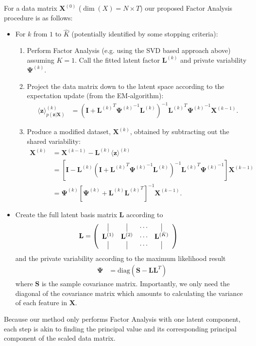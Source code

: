 \documentclass[12pt]{article}
\begin{document}
For a data matrix $\mathbf{X}^{(0)}$ ($\dim(X) = N\times T$) our proposed Factor Analysis procedure is as follows:
\begin{itemize}
	\item For $k$ from $1$ to $\hat{K}$ (potentially identified by some stopping criteria):
	\begin{enumerate}[label=\textbf{(\arabic*)}]
		\item Perform Factor Analysis (e.g. using the SVD based approach above) assuming $K=1$. Call the fitted latent factor $\mathbf{L}^{(k)}$ and private variability $\boldsymbol{\Psi}^{(k)}$.
		\item Project the data matrix down to the latent space according to the expectation update (from the EM-algorithm):
		\begin{align}
			\langle \mathbf{z} \rangle_{p(\mathbf{z}|\mathbf{X})}^{(k)} &= \left(\mathbf{I} +{\mathbf{L}^{(k)}}^T {\boldsymbol{\Psi}^{(k)}}^{-1}\mathbf{L}^{(k)}\right)^{-1} {\mathbf{L}^{(k)}}^T {\boldsymbol{\Psi}^{(k)}}^{-1} \mathbf{X}^{(k-1)}.
		\end{align}
		\item Produce a modified dataset, $\mathbf{X}^{(k)}$, obtained by subtracting out the shared variability:
		\begin{align}
			\mathbf{X}^{(k)} &= \mathbf{X}^{(k-1)} - \mathbf{L}^{(k)} \langle \mathbf{z} \rangle^{(k)} \\
			&= \left[\mathbf{I} - \mathbf{L}^{(k)} \left(\mathbf{I} +{\mathbf{L}^{(k)}}^T {\boldsymbol{\Psi}^{(k)}}^{-1}\mathbf{L}^{(k)} \right)^{-1} {\mathbf{L}^{(k)}}^T {\boldsymbol{\Psi}^{(k)}}^{-1}\right] \mathbf{X}^{(k-1)}  \\
			&= \boldsymbol{\Psi}^{(k)}\left[\boldsymbol{\Psi}^{(k)} + \mathbf{L}^{(k)}{\mathbf{L}^{(k)}}^T\right]^{-1} \mathbf{X}^{(k-1)}.
		\end{align}
	\end{enumerate}
	\item Create the full latent basis matrix $\mathbf{L}$ according to
	\begin{align}
		\mathbf{L} &= \left(\begin{array}{cccc}
			\vline & \vline & \cdots & \vline \\
			\mathbf{L}^{(1)} & 	\mathbf{L}^{(2)} & \cdots & 	\mathbf{L}^{(\hat{K})}\\
			\vline & \vline & \cdots & \vline 
		\end{array}\right)
	\end{align}
	and the private variability according to the maximum likelihood result
	\begin{align}
		\boldsymbol{\Psi} &= \text{diag}\left(\mathbf{S} - \mathbf{LL}^T\right)
	\end{align}
	where $\mathbf{S}$ is the sample covariance matrix. Importantly, we only need the diagonal of the covariance matrix which amounts to calculating the variance of each feature in $\mathbf{X}$.
\end{itemize}
Because our method only performs Factor Analysis with one latent component, each step is akin to finding the principal value and its corresponding principal component of the scaled data matrix. 
\end{document}
